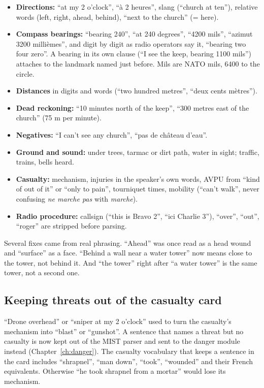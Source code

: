 \begin{itemize}
  \item \textbf{Directions:} ``at my 2 o'clock'', ``à 2 heures'', slang (``church at ten''), relative words
        (left, right, ahead, behind), ``next to the church'' (= here).
  \item \textbf{Compass bearings:} ``bearing 240'', ``at 240 degrees'', ``4200 mils'', ``azimut 3200 millièmes'',
        and digit by digit as radio operators say it, ``bearing two four zero''. A bearing in its own clause
        (``I see the keep, bearing 1100 mils'') attaches to the landmark named just before. Mils are NATO mils,
        6400 to the circle.
  \item \textbf{Distances} in digits and words (``two hundred metres'', ``deux cents mètres'').
  \item \textbf{Dead reckoning:} ``10 minutes north of the keep'', ``300 metres east of the church'' (75 m per minute).
  \item \textbf{Negatives:} ``I can't see any church'', ``pas de château d'eau''.
  \item \textbf{Ground and sound:} under trees, tarmac or dirt path, water in sight; traffic, trains, bells heard.
  \item \textbf{Casualty:} mechanism, injuries in the speaker's own words, AVPU from ``kind of out of it'' or
        ``only to pain'', tourniquet times, mobility (``can't walk'', never confusing \emph{ne marche pas} with
        \emph{marche}).
  \item \textbf{Radio procedure:} callsign (``this is Bravo 2'', ``ici Charlie 3''), ``over'', ``out'', ``roger''
        are stripped before parsing.
\end{itemize}

Several fixes came from real phrasing. ``Ahead'' was once read as a head wound and ``surface'' as a face.
``Behind a wall near a water tower'' now means close to the tower, not behind it. And ``the tower'' right after
``a water tower'' is the same tower, not a second one.

\subsection{Keeping threats out of the casualty card}

``Drone overhead'' or ``sniper at my 2 o'clock'' used to turn the casualty's mechanism into ``blast'' or
``gunshot''. A sentence that names a threat but no casualty is now kept out of the MIST parser and sent to the
danger module instead (Chapter~\ref{ch:danger}). The casualty vocabulary that keeps a sentence in the card
includes ``shrapnel'', ``man down'', ``took'', ``wounded'' and their French equivalents. Otherwise ``he took shrapnel
from a mortar'' would lose its mechanism.

